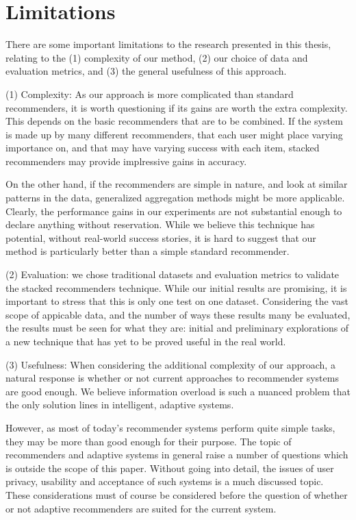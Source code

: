\section{Limitations}

There are some important limitations to the research presented in this thesis,
relating to the 
(1) complexity of our method, 
(2) our choice of data and evaluation metrics, and
(3) the general usefulness of this approach.

(1) Complexity: As our approach is more complicated than standard recommenders,
it is worth questioning if its gains are worth the extra complexity.
This depends on the basic recommenders that are to be combined.
If the system is made up by many different recommenders,
that each user might place varying importance on,
and that may have varying success with each item,
stacked recommenders may provide implressive gains in accuracy.

On the other hand, if the recommenders are simple in nature,
and look at similar patterns in the data,
generalized aggregation methods might be more applicable.
Clearly, the performance gains in our experiments
are not substantial enough to declare anything without reservation.
While we believe this technique has potential,
without real-world success stories, it is hard
to suggest that our method is particularly better
than a simple standard recommender.

(2) Evaluation: we chose traditional datasets and evaluation metrics
to validate the stacked recommenders technique.
While our initial results are promising, it is important to stress
that this is only one test on one dataset. Considering the vast scope
of appicable data, and the number of ways these results many be 
evaluated, the results must be seen for what they are:
initial and preliminary explorations of a new technique
that has yet to be proved useful in the real world.

(3) Usefulness:
When considering the additional complexity of our approach,
a natural response is whether or not current approaches
to recommender systems are good enough.
We believe information overload is such a nuanced problem 
that the only solution lines in intelligent, adaptive systems.

However, as most of today's recommender systems 
perform quite simple tasks, they may be more
than good enough for their purpose.
The topic of recommenders and adaptive systems in general
raise a number of questions which is outside the scope of this paper.
Without going into detail, the issues of user privacy,
usability and acceptance of such systems is a much discussed topic.
These considerations must of course be considered before
the question of whether or not adaptive recommenders
are suited for the current system.



